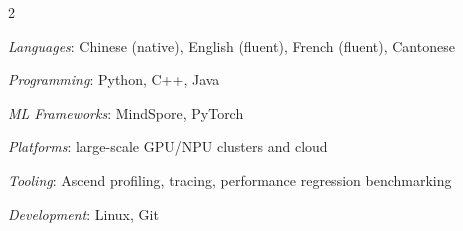 \documentclass[a4paper,9pt]{article}
\begin{document}
{
\begin{multicols}{2}
\raggedright
\footnotesize

\skillListStart
  \item \emph{Languages}: Chinese (native), English (fluent), French (fluent), Cantonese
  \item \emph{Programming}: Python, C++, Java
  \item \emph{ML Frameworks}: MindSpore, PyTorch
  \item \emph{Platforms}: large-scale GPU/NPU clusters and cloud
  \item \emph{Tooling}: Ascend profiling, tracing, performance regression benchmarking
  \item \emph{Development}: Linux, Git
\skillListEnd

\end{multicols}
}
\end{document}
